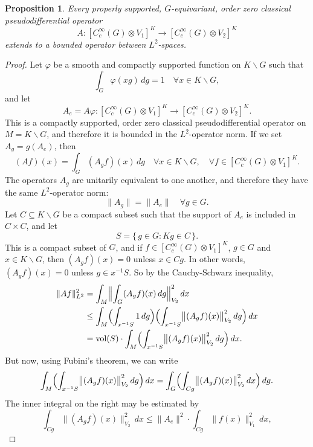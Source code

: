 \documentclass[leqno,11pt]{amsart}
\numberwithin{equation}{subsection}
\theoremstyle{plain}
\newtheorem{proposition}[equation]{Proposition}
\theoremstyle{definition}
\theoremstyle{remark}
\begin{document}
\begin{proposition}
\label{prop-l-2-versus-s-star-boundedness}
  Every  properly supported, $G$-equivariant, order zero classical pseudodifferential operator 
\[
A \colon [C_c^\infty ( G)\otimes V_1]^K \longrightarrow  [C_c^\infty ( G)\otimes V_2]^K 
\]
extends to a bounded operator between $L^2$-spaces.
\end{proposition}

\begin{proof} 
Let $\varphi$ be a smooth and compactly supported function on $K \backslash G$ such that 
\[
\int_G  \varphi (xg) \, dg = 1 \quad \forall x\in K\backslash G,
\]
and let 
\[
A_e {=}  A\varphi  \colon [C_c^\infty ( G)\otimes V_1]^K \longrightarrow  [C_c^\infty ( G)\otimes V_2]^K .
\]
This is a compactly supported,  order zero classical pseudodifferential operator on $M{=}K\backslash G$, and therefore it is bounded in the $L^2$-operator norm. If we set $A_g = g(A_e)$, then 
\[
(A f)(x) = \int_G (A_g f)(x) \, dg \quad \forall x \in K \backslash G,\quad \forall f\in [C_c^\infty ( G)\otimes V_1]^K  .
\]
The operators $A_g$  are unitarily equivalent to one another, and therefore they have the same $L^2$-operator norm:
\[
\| A_g \| = \| A_e\| \quad  \forall g\in G.
\]
Let  $C\subseteq K \backslash G$ be a compact subset such that the  support of $A_e$ is included in 
$C{\times } C$, and let 
\[
S = \{ \, g\in G : Kg \in C\, \} .
\]
This is a compact subset of $G$, and if  $f\in[C_c^\infty ( G)\otimes V_1]^K $, $g\in G$ and $x\in K \backslash G$, then $(A_gf)(x) = 0$ unless $x\in Cg$. In other words, $(A_gf)(x) = 0$ unless $g\in x^{-1}S$. 
So by the Cauchy-Schwarz inequality,
\[
\begin{aligned}
\| A f\|_{L^2}^2 
    & = \int _M \Bigl \| \int_G (A_gf)(x)\, dg \Bigr\|_{V_2}^2 \, dx \\
    & \le \int _M \Bigl ( \int_{x^{-1} S} 1 \, dg\Bigr ) \Bigl (   \int_{x^{-1}S} \bigl \|(A_gf)(x)\bigr \|_{V_2} ^2 \, dg\Bigr )   \, dx \\
    & = \operatorname{vol}(S)\cdot   \int _M \Bigl (\int_{x^{-1}S} \bigl \|(A_gf)(x)\bigr \|_{V_2} ^2 \, dg \Bigr )   \, dx  .
\end{aligned}
\]
But now, using Fubini's theorem, we can write 
\[
\int _M \Bigl (\int_{x^{-1}S} \bigl \|(A_gf)(x)\bigr \|_{V_2} ^2 \, dg \Bigr )   \, dx \\
     = \int _G \Bigl (\int_{Cg}  \bigl \|(A_gf)(x)\bigr \|_{V_2} ^2 \, dx  \Bigr ) \, dg .
\]
The inner integral on the right may be estimated by
\[
\int_{Cg}  \bigl \|(A_gf)(x)\bigr \|_{V_2} ^2 \, dx \le \| A_e\|^2\cdot \int_{Cg}  \bigl \|f(x)\bigr \|_{V_1} ^2 \, dx ,
\]
\end{proof}
\end{document}
